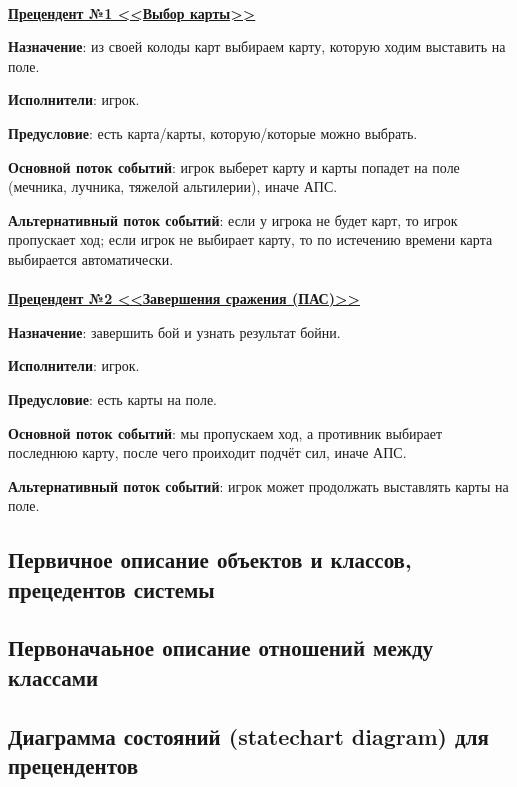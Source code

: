 \documentclass[12pt, a4paper, simple]{eskdtext}
\begin{document}
    \paragraph{}\hspace{0pt}

    \textbf{\underline{Прецендент №1 <<Выбор карты>>}}

    \textbf{Назначение}: из своей колоды карт выбираем карту, которую ходим выставить на поле.

    \textbf{Исполнители}: игрок.

    \textbf{Предусловие}: есть карта/карты, которую/которые можно выбрать.

    \textbf{Основной поток событий}: игрок выберет карту и карты попадет на поле (мечника, лучника, тяжелой альтилерии),
    иначе АПС.

    \textbf{Альтернативный поток событий}: если у игрока не будет карт, то игрок пропускает ход;
    если игрок не выбирает карту, то по истечению времени карта выбирается автоматически.

    \paragraph{}\hspace{0pt}

    \textbf{\underline{Прецендент №2 <<Завершения сражения (ПАС)>>}}

    \textbf{Назначение}: завершить бой и узнать результат бойни.

    \textbf{Исполнители}: игрок.

    \textbf{Предусловие}: есть карты на поле.

    \textbf{Основной поток событий}: мы пропускаем ход, а противник выбирает последнюю карту, после чего проиходит подчёт сил, иначе АПС.

    \textbf{Альтернативный поток событий}: игрок может продолжать выставлять карты на поле.

    \subsection{Первичное описание объектов и классов, прецедентов системы}
    \subsection{Первоначаьное описание отношений между классами}
    \subsection{Диаграмма состояний (statechart diagram) для прецендентов}
    \newpage
\end{document}
